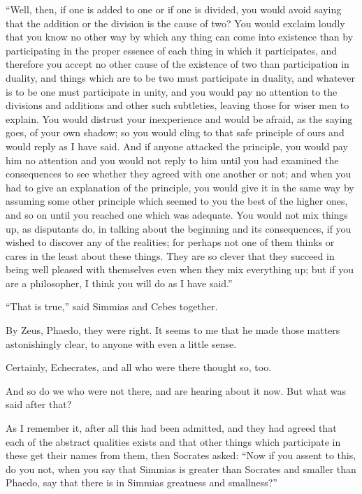 \documentclass[letterpaper,12pt]{article}
\newcommand{\stephpag}[1]{\marginnote{\small\itshape\fontfamily{ppl}\selectfont #1}}
\begin{document}
\begin{drama}
``Well, then, if one is added to one \stephpag{c} or if one is divided, you would avoid saying that the addition or the division is the cause of two? You would exclaim loudly that you know no other way by which any thing can come into existence than by participating in the proper essence of each thing in which it participates, and therefore you accept no other cause of the existence of two than participation in duality, and things which are to be two must participate in duality, and whatever is to be one must participate in unity, and you would pay no attention to the divisions and additions and other such subtleties, leaving those for wiser men to explain. You would distrust \stephpag{d} your inexperience and would be afraid, as the saying goes, of your own shadow; so you would cling to that safe principle of ours and would reply as I have said. And if anyone attacked the principle, you would pay him no attention and you would not reply to him until you had examined the consequences to see whether they agreed with one another or not; and when you had to give an explanation of the principle, you would give it in the same way by assuming some other principle which seemed to you the best of the higher ones, and so on until \stephpag{e} you reached one which was adequate. You would not mix things up, as disputants do, in talking about the beginning and its consequences, if you wished to discover any of the realities; for perhaps not one of them thinks or cares in the least about these things. They are so clever that they succeed in being well pleased with themselves even when they mix everything up; \stephpag{102 a} but if you are a philosopher, I think you will do as I have said.''
 
``That is true,'' said Simmias and Cebes together.
 
\echecratesspeaks
By Zeus, Phaedo, they were right. It seems to me that he made those matters astonishingly clear, to anyone with even a little sense.
 
\phaedospeaks
Certainly, Echecrates, and all who were there thought so, too.
 
\echecratesspeaks
And so do we who were not there, and are hearing about it now. But what was said after that?
 
\phaedospeaks
As I remember it, after all this had been admitted, and they had agreed that \stephpag{b} each of the abstract qualities exists and that other things which participate in these get their names from them, then Socrates asked: ``Now if you assent to this, do you not, when you say that Simmias is greater than Socrates and smaller than Phaedo, say that there is in Simmias greatness and smallness?''
 

\end{drama}
\end{document}
